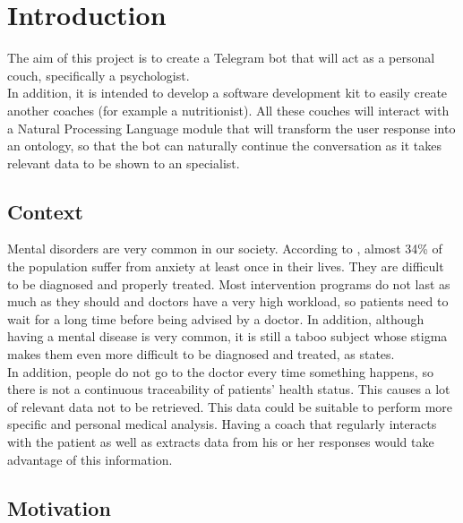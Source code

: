 \documentclass[12pt,english]{article}
\begin{document}


\thispagestyle{empty}
\newpage
\tableofcontents{}
\newpage
\listoffigures
\thispagestyle{empty}
\newpage

\section{Introduction}

The aim of this project is to create a Telegram bot that will act as a personal couch, specifically a psychologist.\\

In addition, it is intended to develop a software development kit to easily create another coaches (for example a nutritionist). All these couches will interact with a Natural Processing Language module that will transform the user response into an ontology, so that the bot can naturally continue the conversation as it takes relevant data to be shown to an specialist.

\subsection{Context}

Mental disorders are very common in our society. According to \cite{Bandelow2015}, almost 34\% of the population suffer from anxiety at least once in their lives. They are difficult to be diagnosed and properly treated. Most intervention programs do not last as much as they should and doctors have a very high workload, so patients need to wait for a long time before being advised by a doctor. In addition, although having a mental disease is very common, it is still a taboo subject whose stigma makes them even more difficult to be diagnosed and treated, as \cite{Davies2000} states.\\

In addition, people do not go to the doctor every time something happens, so there is not a continuous traceability of patients' health status. This causes a lot of relevant data not to be retrieved. This data could be suitable to perform more specific and personal medical analysis. Having a coach that regularly interacts with the patient as well as extracts data from his or her responses would take advantage of this information.


\subsection{Motivation}
\end{document}
